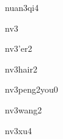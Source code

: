 \begin{multicols*}{2}
\begin{verbete}[暖气]{nuan3qi4}
\end{verbete}

\begin{verbete}[女]{nv3}
\end{verbete}

\begin{verbete}[女儿]{nv3'er2}
\end{verbete}

\begin{verbete}[女孩儿]{nv3hair2}
\end{verbete}

\begin{verbete}[女朋友]{nv3peng2you0}
\end{verbete}

\begin{verbete}[女王]{nv3wang2}
\end{verbete}

\begin{verbete}[女婿]{nv3xu4}
\end{verbete}

\end{multicols*}
